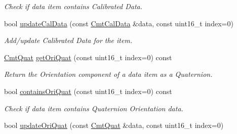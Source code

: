 \begin{DoxyCompactItemize}
\begin{DoxyCompactList}\small\item\em \-Check if data item contains \-Calibrated \-Data. \end{DoxyCompactList}\item 
\hypertarget{classxsens_1_1Packet_aae788017db137f105abd72649ba7d05d}{bool \hyperlink{classxsens_1_1Packet_aae788017db137f105abd72649ba7d05d}{update\-Cal\-Data} (const \hyperlink{structCmtCalData}{\-Cmt\-Cal\-Data} \&data, const uint16\-\_\-t index=0)}\label{classxsens_1_1Packet_aae788017db137f105abd72649ba7d05d}

\begin{DoxyCompactList}\small\item\em \-Add/update \-Calibrated \-Data for the item. \end{DoxyCompactList}\item 
\hyperlink{structCmtQuat}{\-Cmt\-Quat} \hyperlink{classxsens_1_1Packet_a291a6d85dfd0da03e30dde210e4215e0}{get\-Ori\-Quat} (const uint16\-\_\-t index=0) const 
\begin{DoxyCompactList}\small\item\em \-Return the \-Orientation component of a data item as a \-Quaternion. \end{DoxyCompactList}\item 
\hypertarget{classxsens_1_1Packet_a7640015f9d5b820cf0e6b520028f82bb}{bool \hyperlink{classxsens_1_1Packet_a7640015f9d5b820cf0e6b520028f82bb}{contains\-Ori\-Quat} (const uint16\-\_\-t index=0) const }\label{classxsens_1_1Packet_a7640015f9d5b820cf0e6b520028f82bb}

\begin{DoxyCompactList}\small\item\em \-Check if data item contains \-Quaternion \-Orientation data. \end{DoxyCompactList}\item 
\hypertarget{classxsens_1_1Packet_aeb9d7e5fc34ab1c57b68e0377c6cca72}{bool \hyperlink{classxsens_1_1Packet_aeb9d7e5fc34ab1c57b68e0377c6cca72}{update\-Ori\-Quat} (const \hyperlink{structCmtQuat}{\-Cmt\-Quat} \&data, const uint16\-\_\-t index=0)}\label{classxsens_1_1Packet_aeb9d7e5fc34ab1c57b68e0377c6cca72}


\end{DoxyCompactItemize}
